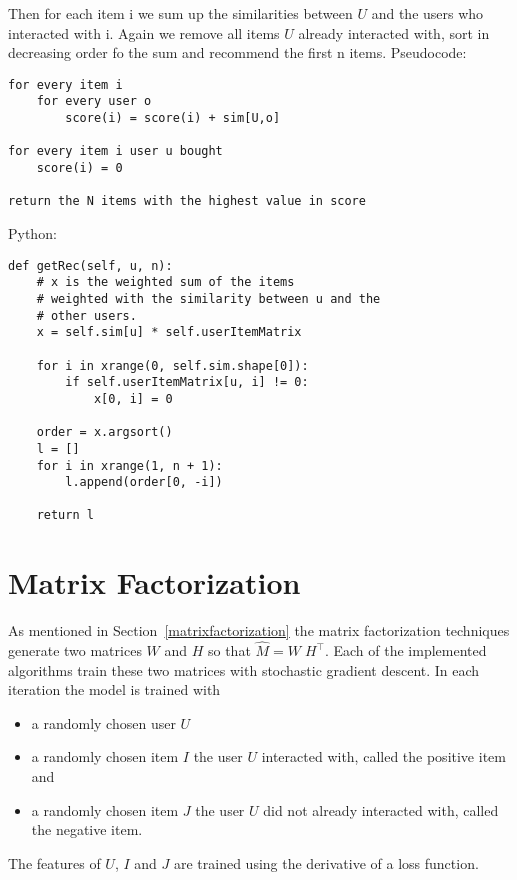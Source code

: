 Then for each item i we sum up the similarities between $U$ and the
users who interacted with i. Again we remove all items $U$ already interacted
with, sort in decreasing order fo the sum and recommend the first
n items.
Pseudocode:
\begin{lstlisting}[style=pseudocode]
for every item i 
    for every user o
        score(i) = score(i) + sim[U,o]

for every item i user u bought
    score(i) = 0

return the N items with the highest value in score
\end{lstlisting}
Python:
\begin{lstlisting}[style=python]
def getRec(self, u, n):
    # x is the weighted sum of the items
    # weighted with the similarity between u and the
    # other users.
    x = self.sim[u] * self.userItemMatrix

    for i in xrange(0, self.sim.shape[0]):
        if self.userItemMatrix[u, i] != 0:
            x[0, i] = 0

    order = x.argsort()
    l = []
    for i in xrange(1, n + 1):
        l.append(order[0, -i])

    return l
\end{lstlisting}

\section{Matrix Factorization}
As mentioned in Section~\ref{matrixfactorization} the matrix factorization
techniques generate two matrices \(W\) and \(H\) so that \(\hat{M} = W\;H^\top\).
Each of the implemented algorithms train these two matrices with stochastic
gradient descent. In each iteration the model is trained with
\begin{itemize} 
    \item a randomly chosen user $U$
    \item a randomly chosen item $I$ the user $U$ interacted with, called the positive item and 
    \item a randomly chosen item $J$ the user $U$ did not already interacted with, 
        called the negative item.
\end{itemize}
The features of $U$, $I$ and $J$ are trained using the derivative
of a loss function.

